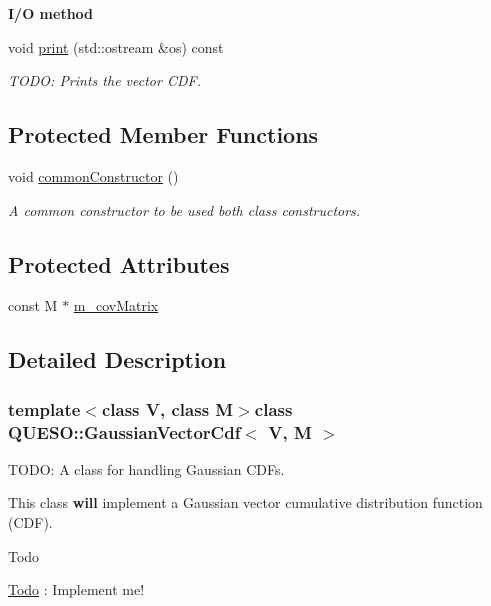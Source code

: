 \begin{Indent}{\bf I/\-O method}\par
\begin{DoxyCompactItemize}
\item 
void \hyperlink{class_q_u_e_s_o_1_1_gaussian_vector_cdf_a9afe1cc5333789fb73974a0d17e7fc0c}{print} (std\-::ostream \&os) const 
\begin{DoxyCompactList}\small\item\em T\-O\-D\-O\-: Prints the vector C\-D\-F. \end{DoxyCompactList}\end{DoxyCompactItemize}
\end{Indent}
\subsection*{Protected Member Functions}
\begin{DoxyCompactItemize}
\item 
void \hyperlink{class_q_u_e_s_o_1_1_gaussian_vector_cdf_a82118210a9047b9e9f393159d53d5a20}{common\-Constructor} ()
\begin{DoxyCompactList}\small\item\em A common constructor to be used both class constructors. \end{DoxyCompactList}\end{DoxyCompactItemize}
\subsection*{Protected Attributes}
\begin{DoxyCompactItemize}
\item 
const M $\ast$ \hyperlink{class_q_u_e_s_o_1_1_gaussian_vector_cdf_a0b00fdc02b3e15cd81d215d5c01bbd1f}{m\-\_\-cov\-Matrix}
\end{DoxyCompactItemize}


\subsection{Detailed Description}
\subsubsection*{template$<$class V, class M$>$class Q\-U\-E\-S\-O\-::\-Gaussian\-Vector\-Cdf$<$ V, M $>$}

T\-O\-D\-O\-: A class for handling Gaussian C\-D\-Fs. 

This class {\bfseries will} implement a Gaussian vector cumulative distribution function (C\-D\-F). \begin{DoxyRefDesc}{Todo}
\item[\hyperlink{todo__todo000018}{Todo}]\-: Implement me! \end{DoxyRefDesc}


